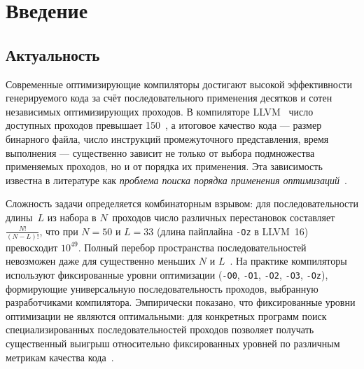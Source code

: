 \section{Введение}

\subsection{Актуальность}

Современные оптимизирующие компиляторы достигают высокой эффективности генерируемого кода за счёт последовательного применения десятков и сотен независимых оптимизирующих проходов. В компиляторе LLVM~\cite{lattner2004llvm} число доступных проходов превышает 150~\cite{ashouri2018survey}, а итоговое качество кода --- размер бинарного файла, число инструкций промежуточного представления, время выполнения --- существенно зависит не только от выбора подмножества применяемых проходов, но и от порядка их применения. Эта зависимость известна в литературе как \emph{проблема поиска порядка применения оптимизаций}~\cite{cooper1999genetic, almagor2004finding, kulkarni2006exhaustive}.

Сложность задачи определяется комбинаторным взрывом: для последовательности длины~$L$ из набора в $N$~проходов число различных перестановок составляет $\frac{N!}{(N-L)!}$, что при $N=50$ и $L=33$ (длина пайплайна \texttt{-Oz} в LLVM~16) превосходит $10^{49}$. Полный перебор пространства последовательностей невозможен даже для существенно меньших $N$ и $L$~\cite{kulkarni2006exhaustive}. На практике компиляторы используют фиксированные уровни оптимизации (\texttt{-O0}, \texttt{-O1}, \texttt{-O2}, \texttt{-O3}, \texttt{-Oz}), формирующие универсальную последовательность проходов, выбранную разработчиками компилятора. Эмпирически показано, что фиксированные уровни оптимизации не являются оптимальными: для конкретных программ поиск специализированных последовательностей проходов позволяет получать существенный выигрыш относительно фиксированных уровней по различным метрикам качества кода~\cite{kulkarni2012mitigating, liang2023learning, pan2026ecco}.

